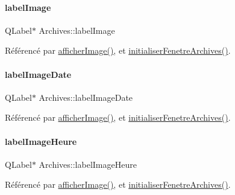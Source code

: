 \paragraph{\texorpdfstring{label\+Image}{labelImage}}
{\footnotesize\ttfamily Q\+Label$\ast$ Archives\+::label\+Image\hspace{0.3cm}{\ttfamily [private]}}



Référencé par \hyperlink{class_archives_a0e12a12774643d96831be4daba73976e}{afficher\+Image()}, et \hyperlink{class_archives_a1842ebad3721929949bc07be5144b79c}{initialiser\+Fenetre\+Archives()}.

\mbox{\label{class_archives_accb81477f1edca94691ae630ddc1f3f9}} 
\paragraph{\texorpdfstring{label\+Image\+Date}{labelImageDate}}
{\footnotesize\ttfamily Q\+Label$\ast$ Archives\+::label\+Image\+Date\hspace{0.3cm}{\ttfamily [private]}}



Référencé par \hyperlink{class_archives_a0e12a12774643d96831be4daba73976e}{afficher\+Image()}, et \hyperlink{class_archives_a1842ebad3721929949bc07be5144b79c}{initialiser\+Fenetre\+Archives()}.

\mbox{\label{class_archives_ab678af24ff4c67b8791ab52e998c79cb}} 
\paragraph{\texorpdfstring{label\+Image\+Heure}{labelImageHeure}}
{\footnotesize\ttfamily Q\+Label$\ast$ Archives\+::label\+Image\+Heure\hspace{0.3cm}{\ttfamily [private]}}



Référencé par \hyperlink{class_archives_a0e12a12774643d96831be4daba73976e}{afficher\+Image()}, et \hyperlink{class_archives_a1842ebad3721929949bc07be5144b79c}{initialiser\+Fenetre\+Archives()}.

\mbox{\label{class_archives_a61376e4ec330aea053fede230a1bc786}} 

